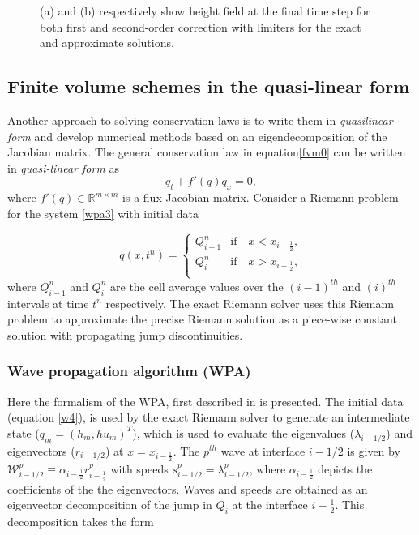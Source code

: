 \documentclass[10pt,a4paper]{article}
\begin{document}
\begin{figure}[H]
\begin{subfigure}[b]{0.5\textwidth}
			\caption{}
			\label{fig:exapp}
		\end{subfigure}
		\caption{(a) and (b) respectively show height field at the final time step for both first and second-order correction with limiters for the exact and approximate solutions.}
	\end{figure}
	
	
	\subsection{Finite volume schemes in the quasi-linear form}
	Another approach to solving conservation laws is to write  them in  {\em quasilinear form} and develop numerical methods based on an eigendecomposition of the Jacobian matrix. The general conservation law in equation\eqref{fvm0} can be written in {\em quasi-linear form}
	as
	\begin{equation}
		q_{t} + f'(q)q_{x} = 0,
		\label{wpa3}
	\end{equation}
	where  $f'(q) \in \mathbb{R}^{m\times m}$  is a flux Jacobian matrix.  Consider a Riemann problem for the system  \eqref{wpa3} with initial data 
	
	\begin{equation}
		q(x,t^n)  = \begin{cases}
			Q_{i-1}^{n}  & \text{if} \quad  x < x_{i-\frac{1}{2}},\\
			Q_{i}^{n} & \text{if} \quad x > x_{i-\frac{1}{2}},\\
		\end{cases}    
		\label{w4}   
	\end{equation}
	where $Q_{i-1}^{n}$ and $Q_{i}^{n}$ are the cell average values over the $(i-1)^{th}$ and $(i)^{th}$ intervals at time $t^{n}$ respectively.  The exact Riemann solver uses this Riemann problem to approximate the precise Riemann solution as a piece-wise constant solution with propagating jump discontinuities. 
	
	\subsubsection{Wave propagation algorithm (WPA)}
	Here the formalism of the WPA, first described in  \citet{le:1997} is presented.   The initial data (equation \eqref{w4}), is used by the exact Riemann solver to generate an intermediate state ($q_m = (h_m, hu_m)^T$), which is used to evaluate the eigenvalues ($\lambda_{i-1/2}$) and eigenvectors ($r_{i-1/2}$) at $x = x_{i-\frac{1}{2}}$. The $p^{th}$ wave at interface $i-1/2$ is given by $\mathcal W^p_{i-1/2} \equiv \alpha_{i-\frac{1}{2}} r^p_{i-\frac{1}{2}}$ with speeds $s^p_{i-1/2} = \lambda^p_{i-1/2}$, where $ \alpha_{i-\frac{1}{2}}$ depicts the coefficients of the the eigenvectors.  Waves and speeds are obtained as an eigenvector decomposition of the jump in $Q_i$ at the interface $i-\frac{1}{2}$.  This decomposition takes the form
	
\end{document}
